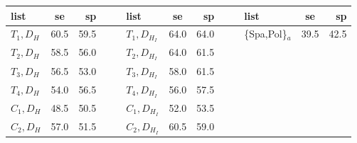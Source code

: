 \begin{table}
\begin{center}
{{\begin{tabular}{lcr	cc lcr cc lcr }
\midrule
list & \acs{se} & \acs{sp} & & & list & \acs{se} & \acs{sp} & & & list & \acs{se} & \acs{sp}\\
\midrule
$T_{1}, D_{H}$ & 60.5 & 59.5 & & &\cellcolor[gray]{0.8}$T_{1}, D_{H_{I}}$ &\cellcolor[gray]{0.8}64.0 &\cellcolor[gray]{0.8}64.0 & & &  \{Spa,Pol\}$_{a}$ & 39.5 & 42.5\\
$T_{2}, D_{H}$ & 58.5 & 56.0 & & &\cellcolor[gray]{0.8}$T_{2}, D_{H_{I}}$ &\cellcolor[gray]{0.8}64.0 &\cellcolor[gray]{0.8}61.5  \\
$T_{3}, D_{H}$ & 56.5 & 53.0 & & & $T_{3}, D_{H_{I}}$ & 58.0 & 61.5 \\
$T_{4}, D_{H}$ & 54.0 & 56.5 & & & $T_{4}, D_{H_{I}}$ & 56.0 & 57.5  \\
$C_{1}, D_{H}$ & 48.5 & 50.5 & & & $C_{1}, D_{H_{I}}$ & 52.0 & 53.5  \\
$C_{2}, D_{H}$ & 57.0 & 51.5 & & & $C_{2}, D_{H_{I}}$ & 60.5 & 59.0  \\

\bottomrule

\end{tabular}}}
\end{center}
\label{tab:table5}
\end{table}



